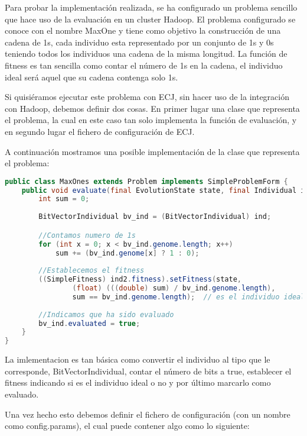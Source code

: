 \label{desarrollo-maxone}
Para probar la implementación realizada, se ha configurado un problema sencillo que hace uso de la evaluación en un cluster Hadoop. El problema configurado se conoce con el nombre MaxOne y tiene como objetivo la construcción de una cadena de 1s, cada individuo esta representado por un conjunto de 1s y 0s teniendo todos los individuos una cadena de la misma longitud. La función de fitness es tan sencilla como contar el n\'umero de 1s en la cadena, el individuo ideal ser\'a aquel que su cadena contenga solo 1s.

Si quisiéramos ejecutar este problema con ECJ, sin hacer uso de la integración con Hadoop, debemos definir dos cosas. En primer lugar una clase que representa el problema, la cual en este caso tan solo implementa la función de evaluación, y en segundo lugar el fichero de configuración de ECJ.

A continuación mostramos una posible implementación de la clase que representa el problema:

\begin{lstlisting}[language=Java]
public class MaxOnes extends Problem implements SimpleProblemForm {
	public void evaluate(final EvolutionState state, final Individual ind, final int subpopulation, final int threadnum) {
		int sum = 0;
		
		BitVectorIndividual bv_ind = (BitVectorIndividual) ind;

		//Contamos numero de 1s
		for (int x = 0; x < bv_ind.genome.length; x++)
			sum += (bv_ind.genome[x] ? 1 : 0);
		
		//Establecemos el fitness
		((SimpleFitness) ind2.fitness).setFitness(state,
				(float) (((double) sum) / bv_ind.genome.length),
				sum == bv_ind.genome.length);  // es el individuo ideal?
		
		//Indicamos que ha sido evaluado
		bv_ind.evaluated = true;
	}
}
\end{lstlisting}

La imlementacion es tan b\'asica como convertir el individuo al tipo que le corresponde, BitVectorIndividual, contar el n\'umero de bits a true, establecer el fitness indicando si es el individuo ideal o no y por \'ultimo marcarlo como evaluado.

Una vez hecho esto debemos definir el fichero de configuración (con un nombre como config.params), el cual puede contener algo como lo siguiente:

